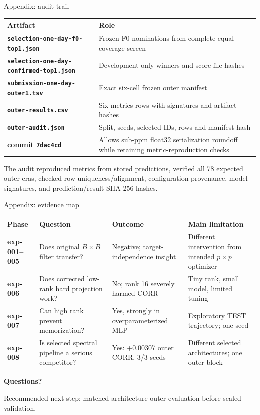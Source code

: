 \documentclass[aspectratio=169,10pt]{beamer}
\begin{document}
\begin{frame}{Appendix: audit trail}
  \tiny
  \begin{tabular}{>{\bfseries}p{3.3cm}p{8.4cm}}
    \toprule
    Artifact & Role \\
    \midrule
    \texttt{selection-one-day-}\newline\texttt{f0-top1.json} & Frozen F0 nominations from complete equal-coverage screen \\
    \texttt{selection-one-day-}\newline\texttt{confirmed-top1.json} & Development-only winners and score-file hashes \\
    \texttt{submission-one-day-}\newline\texttt{outer1.tsv} & Exact six-cell frozen outer manifest \\
    \texttt{outer-results.csv} & Six metrics rows with signatures and artifact hashes \\
    \texttt{outer-audit.json} & Split, seeds, selected IDs, rows and manifest hash \\
    commit \texttt{7dac4cd} & Allows sub-ppm float32 serialization roundoff while retaining metric-reproduction checks \\
    \bottomrule
  \end{tabular}
  \vspace{0.6em}
  \par\raggedright
  The audit reproduced metrics from stored predictions, verified all 78 expected outer eras, checked row uniqueness/alignment, configuration provenance, model signatures, and prediction/result SHA-256 hashes.
\end{frame}

\begin{frame}{Appendix: evidence map}
  \small
  \begin{tabular}{>{\bfseries}p{2.2cm}p{3.0cm}p{3.1cm}p{4.5cm}}
    \toprule
    Phase & Question & Outcome & Main limitation \\
    \midrule
    exp-001--005 & Does original $B\times B$ filter transfer? & Negative; target-independence insight & Different intervention from intended $p\times p$ optimizer \\
    exp-006 & Does corrected low-rank hard projection work? & No; rank 16 severely harmed CORR & Tiny rank, small model, limited tuning \\
    exp-007 & Can high rank prevent memorization? & Yes, strongly in overparameterized MLP & Exploratory TEST trajectory; one seed \\
    exp-008 & Is selected spectral pipeline a serious competitor? & Yes: +0.00307 outer CORR, 3/3 seeds & Different selected architectures; one outer block \\
    \bottomrule
  \end{tabular}
\end{frame}

\begin{frame}[plain]
  \vfill
  \centering
  {\Huge\bfseries Questions?}\par
  \vspace{1em}
  {\large\color{muted}Recommended next step: matched-architecture outer evaluation before sealed validation.}
  \vfill
\end{frame}
\end{document}
